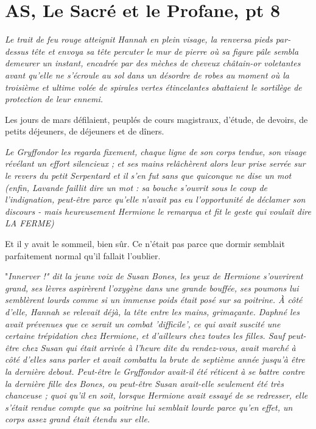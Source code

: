 
\chapter{AS, Le Sacré et le Profane, pt 8}

\emph{Le trait de feu rouge atteignit Hannah en plein visage, la renversa pieds par-dessus tête et envoya sa tête percuter le mur de pierre où sa figure pâle sembla demeurer un instant, encadrée par des mèches de cheveux châtain-or voletantes avant qu'elle ne s'écroule au sol dans un désordre de robes au moment où la troisième et ultime volée de spirales vertes étincelantes abattaient le sortilège de protection de leur ennemi.} 

Les jours de mars défilaient, peuplés de cours magistraux, d'étude, de devoirs, de petits déjeuners, de déjeuners et de dîners.

\emph{Le Gryffondor les regarda fixement, chaque ligne de son corps tendue, son visage révélant un effort silencieux ; et ses mains relâchèrent alors leur prise serrée sur le revers du petit Serpentard et il s'en fut sans que quiconque ne dise un mot (enfin, Lavande faillit dire un mot : sa bouche s'ouvrit sous le coup de l'indignation, peut-être parce qu'elle n'avait pas eu l'opportunité de déclamer son discours - mais heureusement Hermione le remarqua et fit le geste qui voulait dire LA FERME)} 

Et il y avait le sommeil, bien sûr. Ce n'était pas parce que dormir semblait parfaitement normal qu'il fallait l'oublier.

"\emph{Innerver !" dit la jeune voix de Susan Bones, les yeux de Hermione s'ouvrirent grand, ses lèvres aspirèrent l'oxygène dans une grande bouffée, ses poumons lui semblèrent lourds comme si un immense poids était posé sur sa poitrine. À côté d'elle, Hannah se relevait déjà, la tête entre les mains, grimaçante. Daphné les avait prévenues que ce serait un combat 'difficile', ce qui avait suscité une certaine trépidation chez Hermione, et d'ailleurs chez toutes les filles. Sauf peut-être chez Susan qui était arrivée à l'heure dite du rendez-vous, avait marché à côté d'elles sans parler et avait combattu la brute de septième année jusqu'à être la dernière debout. Peut-être le Gryffondor avait-il été réticent à se battre contre la dernière fille des Bones, ou peut-être Susan avait-elle seulement été très chanceuse ; quoi qu'il en soit, lorsque Hermione avait essayé de se redresser, elle s'était rendue compte que sa poitrine lui semblait lourde parce qu'en effet, un corps assez grand était étendu sur elle.} 


